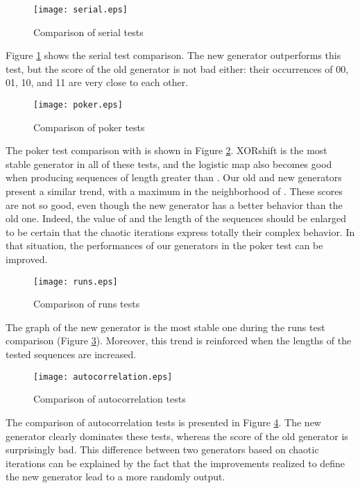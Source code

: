 \documentclass[journal]{IEEEtran}
\begin{document}
\begin{figure}
\centering
\texttt{[image: serial.eps]}
\caption{Comparison of serial tests}
\label{serial}
\end{figure}

Figure \ref{serial} shows the serial test comparison. The new generator outperforms this test, but the score of the old generator is not bad either: their occurrences of 00, 01, 10, and 11 are very close to each other.

\begin{figure}
\centering
\texttt{[image: poker.eps]}
\caption{Comparison of poker tests}
\label{poker}
\end{figure}

The poker test comparison with  is shown in Figure \ref{poker}. XORshift is the most stable generator in all of these tests, and the logistic map also becomes good when producing sequences of length greater than . 
Our old and new generators present a similar trend, with a maximum in the neighborhood of . These scores are not so good, even though the new generator has a better behavior than the old one. 
Indeed, the value of  and the length of the sequences should be enlarged to be certain that the chaotic iterations express totally their complex behavior. In that situation, the performances of our generators in the poker test can be improved.


\begin{figure}
\centering
\texttt{[image: runs.eps]}
\caption{Comparison of runs tests}
\label{runs}
\end{figure}

The graph of the new generator is the most stable one during the runs test comparison (Figure \ref{runs}). Moreover, this trend is reinforced when the lengths of the tested sequences are increased.


\begin{figure}
\centering
\texttt{[image: autocorrelation.eps]}
\caption{Comparison of autocorrelation tests}
\label{autocorrelation}
\end{figure}


The comparison of autocorrelation tests is presented in Figure \ref{autocorrelation}. The new generator clearly dominates these tests, whereas the score of the old generator is surprisingly bad. This difference between two generators based on chaotic iterations can be explained by the fact that the improvements realized to define the new generator lead to a more randomly output.
\end{document}
